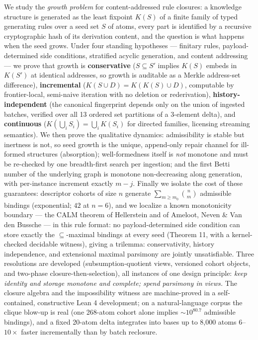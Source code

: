 \documentclass[
  10pt,
]{article}
\begin{document}
We study the \emph{growth problem} for content-addressed rule closures:
a knowledge structure is generated as the least fixpoint \(K(S)\) of a
finite family of typed generating rules over a seed set \(S\) of atoms,
every part is identified by a recursive cryptographic hash of its
derivation content, and the question is what happens when the seed
grows. Under four standing hypotheses --- finitary rules,
payload-determined side conditions, stratified acyclic generation, and
content addressing --- we prove that growth is \textbf{conservative}
(\(S \subseteq S'\) implies \(K(S)\) embeds in \(K(S')\) at identical
addresses, so growth is auditable as a Merkle address-set difference),
\textbf{incremental} (\(K(S \cup D) = K(K(S) \cup D)\), computable by
frontier-local, semi-naive iteration with no deletion or rederivation),
\textbf{history-independent} (the canonical fingerprint depends only on
the union of ingested batches, verified over all 13 ordered set
partitions of a 3-element delta), and \textbf{continuous}
(\(K(\bigcup_i S_i) = \bigcup_i K(S_i)\) for directed families,
licensing streaming semantics). We then prove the qualitative dynamics:
admissibility is stable but inertness is not, so seed growth is the
unique, append-only repair channel for ill-formed structures
(absorption); well-formedness itself is \emph{not} monotone and must be
re-checked by one breadth-first search per ingestion; and the first
Betti number of the underlying graph is monotone non-decreasing along
generation, with per-instance increment exactly \(m - j\). Finally we
isolate the cost of these guarantees: descriptor cohorts of size \(n\)
generate \(\sum_{m \ge m_0}\binom{n}{m}\) admissible bindings
(exponential; \(42\) at \(n=6\)), and we localize a known monotonicity
boundary --- the CALM theorem of Hellerstein and of Ameloot, Neven \&
Van den Bussche --- in this rule format: no payload-determined side
condition can store exactly the \(\subseteq\)-maximal bindings at every
seed (Theorem 11, with a kernel-checked decidable witness), giving a
trilemma: conservativity, history independence, and extensional maximal
parsimony are jointly unsatisfiable. Three resolutions are developed
(subsumption-quotient views, versioned cohort objects, and two-phase
closure-then-selection), all instances of one design principle:
\emph{keep identity and storage monotone and complete; spend parsimony
in views.} The closure algebra and the impossibility witness are
machine-proved in a self-contained, constructive Lean 4 development; on
a natural-language corpus the clique blow-up is real (one 268-atom
cohort alone implies \(\sim\!10^{80.7}\) admissible bindings), and a
fixed 20-atom delta integrates into bases up to 8,000 atoms
\(6\)--\(10\times\) faster incrementally than by batch reclosure.
\end{document}
